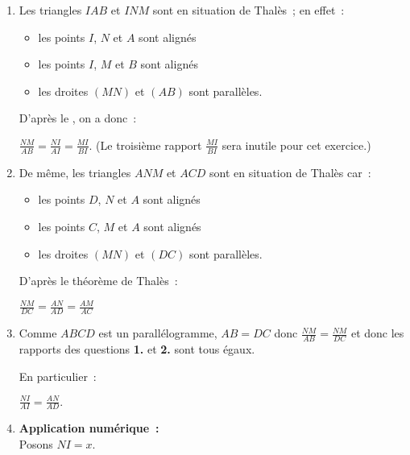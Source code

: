 \begin{corrige}
     \begin{enumerate}
          \item
          Les triangles $ IAB $ et $ INM $ sont en situation de Thalès~; en effet~:
          \begin{itemize}
               \item
               les points $I$, $N$ et $A$ sont alignés
               \item
               les points $ I $, $M$ et $ B $ sont alignés
               \item
               les droites $  \left( MN \right)   $ et $  \left( AB \right)   $ sont parallèles.
          \end{itemize}
          D'après le , on a donc~:
          \par
          $ \frac{ NM }{ AB } = \frac{ NI }{ AI }   = \frac{ MI }{ BI } .  $
          \medskip
          (Le troisième rapport $  \frac{ MI }{ BI }  $ sera inutile pour cet exercice.)
          \item
          De même, les triangles $ ANM $ et $ ACD $ sont en situation de Thalès car~:
          \begin{itemize}
               \item
               les points $D$, $N$ et $A$ sont alignés
               \item
               les points $ C$, $M$ et $ A $ sont alignés
               \item
               les droites $  \left( MN \right)   $ et $  \left( DC \right)   $ sont parallèles.
          \end{itemize}
          D'après le théorème de Thalès~:
          \par
          $ \frac{ NM }{ DC } = \frac{ AN }{ AD } = \frac{ AM }{ AC }    $
          \item
          Comme $ ABCD $ est un parallélogramme, $ AB=DC $ donc $ \frac{ NM }{ AB } = \frac{ NM }{ DC }    $ et donc les rapports des questions  \textbf{1.} et  \textbf{2.} sont tous égaux.
          \par
          En particulier~:
          \par
          $ \frac{ NI }{ AI } = \frac{ AN }{ AD }.$
          \item  \textbf{Application numérique~: }
          \\
          Posons $ NI = x. $
          \par

\end{enumerate}
\end{corrige}
